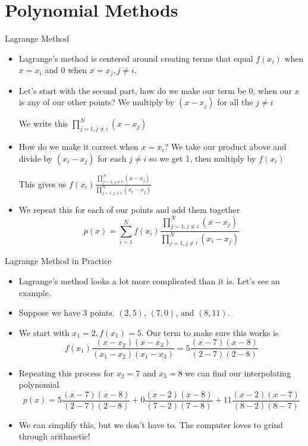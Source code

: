 {}\documentclass[letterpaper,
compress,
xcolor=x11names,
]{beamer}
\begin{document}
\section{Polynomial Methods}

\begin{frame}{Lagrange Method}
	\footnotesize
	\begin{itemize}
		\item Lagrange's method is centered around creating terms that equal $f(x_i)$ when $x=x_i$ and 0 when $x=x_j, j\neq i$.
		\item<2-> Let's start with the second part, how do we make our term be 0, when our $x$ is any of our other points? We multiply by $(x-x_j)$ for all the $j\neq i$ 
		\begin{center}
			We write this $\displaystyle\prod_{j=1, j\neq i}^{N}(x-x_j)$
		\end{center}
		\item<3-> How do we make it correct when $x=x_i$? We take our product above and divide by $(x_i-x_j)$ for each $j\neq i$ so we get 1, then multiply by $f(x_i)$
		\begin{center}
			This gives us  $\displaystyle f(x_i)\frac{\prod_{j=1, j\neq i}^{N}(x-x_j)}{\prod_{j=1, j\neq i}^{N}(x_i-x_j)}$
		\end{center}
		\item<4-> We repeat this for each of our points and add them together
		\begin{equation*}
			p(x) = \sum_{i=1}^{N}f(x_i)\frac{\prod_{j=1, j\neq i}^{N}(x-x_j)}{\prod_{j=1, j\neq i}^{N}(x_i-x_j)}
		\end{equation*}
	\end{itemize}
\end{frame}


\begin{frame}{Lagrange Method in Practice}
	\footnotesize
	\begin{itemize}
		\item Lagrange's method looks a lot more complicated than it is. Let's see an example.
		\item Suppose we have 3 points. $(2,5)$, $(7,0)$, and $(8,11)$.
		\item<2-> We start with $x_1 = 2, f(x_1) = 5$. Our term to make sure this works is 
		\begin{equation*}
			f(x_1)\frac{(x-x_2)(x-x_3)}{(x_1 - x_2)(x_1 - x_3)} = 5\frac{(x-7)(x-8)}{(2-7)(2-8)}
		\end{equation*}
		\item<2-> Repeating this process for $x_2 = 7$ and $x_3 = 8$ we can find our interpolating polynomial
		\begin{equation*}
			p(x) = 5\frac{(x-7)(x-8)}{(2-7)(2-8)} + 0\frac{(x-2)(x-8)}{(7-2)(7-8)} + 11\frac{(x-2)(x-7)}{(8-2)(8-7)}
		\end{equation*}
		\item<3-> We can simplify this, but we don't have to. The computer loves to grind through arithmetic!
	\end{itemize}
\end{frame}
\end{document}
